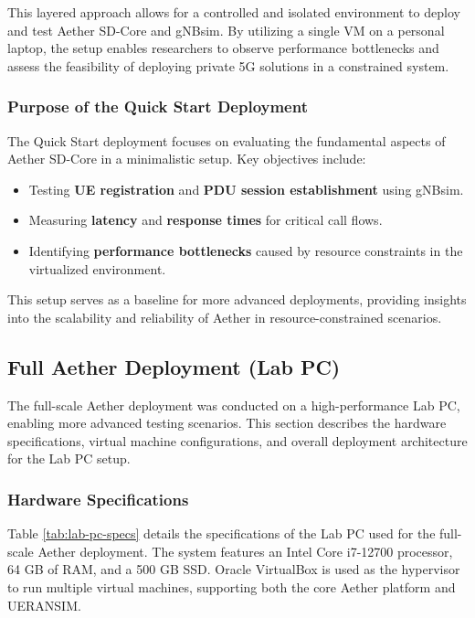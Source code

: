 This layered approach allows for a controlled and isolated environment to deploy and test Aether SD-Core and gNBsim. By utilizing a single VM on a personal laptop, the setup enables researchers to observe performance bottlenecks and assess the feasibility of deploying private 5G solutions in a constrained system.

\subsubsection{Purpose of the Quick Start Deployment}

The Quick Start deployment focuses on evaluating the fundamental aspects of Aether SD-Core in a minimalistic setup. Key objectives include:

\begin{itemize}
    \item Testing \textbf{UE registration} and \textbf{PDU session establishment} using gNBsim.
    \item Measuring \textbf{latency} and \textbf{response times} for critical call flows.
    \item Identifying \textbf{performance bottlenecks} caused by resource constraints in the virtualized environment.
\end{itemize}

This setup serves as a baseline for more advanced deployments, providing insights into the scalability and reliability of Aether in resource-constrained scenarios.


\subsection{Full Aether Deployment (Lab PC)}

The full-scale Aether deployment was conducted on a high-performance Lab PC, enabling more advanced testing scenarios. This section describes the hardware specifications, virtual machine configurations, and overall deployment architecture for the Lab PC setup.

\subsubsection{Hardware Specifications}

Table \ref{tab:lab-pc-specs} details the specifications of the Lab PC used for the full-scale Aether deployment. The system features an Intel Core i7-12700 processor, 64 GB of RAM, and a 500 GB SSD. Oracle VirtualBox is used as the hypervisor to run multiple virtual machines, supporting both the core Aether platform and UERANSIM.

